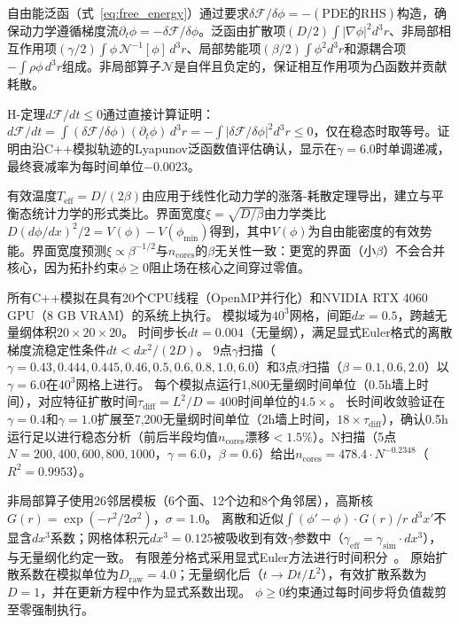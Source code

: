 \documentclass[sn-nature,pdflatex]{sn-jnl}
\begin{document}
自由能泛函（式~\ref{eq:free_energy}）通过要求$\delta\mathcal{F}/\delta\phi = -(\text{PDE的RHS})$构造，确保动力学遵循梯度流$\partial_t\phi = -\delta\mathcal{F}/\delta\phi$。泛函由扩散项$(D/2)\int |\nabla\phi|^2 d^3r$、非局部相互作用项$(\gamma/2)\int\phi\,\mathcal{N}^{-1}[\phi]\,d^3r$、局部势能项$(\beta/2)\int\phi^2 d^3r$和源耦合项$-\int\rho\phi\,d^3r$组成。非局部算子$\mathcal{N}$是自伴且负定的，保证相互作用项为凸函数并贡献耗散。

H-定理$d\mathcal{F}/dt \le 0$通过直接计算证明：$d\mathcal{F}/dt = \int (\delta\mathcal{F}/\delta\phi)(\partial_t\phi)\,d^3r = -\int |\delta\mathcal{F}/\delta\phi|^2 d^3r \le 0$，仅在稳态时取等号。证明由沿C++模拟轨迹的Lyapunov泛函数值评估确认，显示在$\gamma = 6.0$时单调递减，最终衰减率为每时间单位$-0.0023$。

有效温度$T_{\text{eff}} = D/(2\beta)$由应用于线性化动力学的涨落-耗散定理导出，建立与平衡态统计力学的形式类比。界面宽度$\xi = \sqrt{D/\beta}$由力学类比$D(d\phi/dx)^2/2 = V(\phi) - V(\phi_{\min})$得到，其中$V(\phi)$为自由能密度的有效势能。界面宽度预测$\xi \propto \beta^{-1/2}$与$n_{\text{cores}}$的$\beta$无关性一致：更宽的界面（小$\beta$）不会合并核心，因为拓扑约束$\phi \ge 0$阻止场在核心之间穿过零值。

所有C++模拟在具有20个CPU线程（OpenMP并行化）和NVIDIA RTX 4060 GPU（8 GB VRAM）的系统上执行。
模拟域为$40^3$网格，间距$dx = 0.5$，跨越无量纲体积$20 \times 20 \times 20$。
时间步长$dt = 0.004$（无量纲），满足显式Euler格式的离散梯度流稳定性条件$dt < dx^2/(2D)$。
9点$\gamma$扫描（$\gamma = 0.43, 0.444, 0.445, 0.46, 0.5, 0.6, 0.8, 1.0, 6.0$）和3点$\beta$扫描（$\beta = 0.1, 0.6, 2.0$）以$\gamma=6.0$在$40^3$网格上进行。
每个模拟点运行1,800无量纲时间单位（0.5h墙上时间），对应特征扩散时间$\tau_{\text{diff}} = L^2/D = 400$时间单位的$4.5\times$。
长时间收敛验证在$\gamma = 0.4$和$\gamma = 1.0$扩展至7,200无量纲时间单位（2h墙上时间，$18\times\tau_{\text{diff}}$），确认0.5h运行足以进行稳态分析（前后半段均值$n_{\text{cores}}$漂移$<1.5\%$）。N扫描（5点$N=200, 400, 600, 800, 1000$，$\gamma=6.0$，$\beta=0.6$）给出$n_{\text{cores}} = 478.4 \cdot N^{-0.2348}$（$R^2=0.9953$）。

非局部算子使用26邻居模板（6个面、12个边和8个角邻居），高斯核$G(r) = \exp(-r^2/2\sigma^2)$，$\sigma = 1.0$。
离散和近似$\int (\phi'-\phi)\cdot G(r)/r \; d^3x'$不显含$dx^3$系数；网格体积元$dx^3 = 0.125$被吸收到有效$\gamma$参数中（$\gamma_{\text{eff}} = \gamma_{\text{sim}} \cdot dx^3$），与无量纲化约定一致。
有限差分格式采用显式Euler方法进行时间积分~\cite{leveque_2007}。
原始扩散系数在模拟单位为$D_{\text{raw}} = 4.0$；无量纲化后（$t \to D t / L^2$），有效扩散系数为$D = 1$，并在更新方程中作为显式系数出现。
$\phi \ge 0$约束通过每时间步将负值裁剪至零强制执行。
\end{document}
